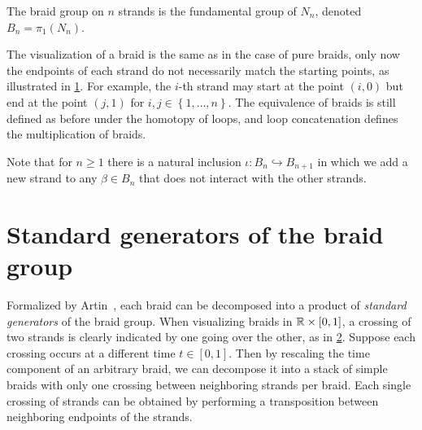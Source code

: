 \begin{definition}
    The braid group on $n$ strands is the fundamental group of $N_n$, denoted $B_n = \pi_1(N_n)$.
\end{definition}

The visualization of a braid is the same as in the case of pure braids, only now the endpoints of each strand do not necessarily match the starting points, as illustrated in \cref{fig:C_general_braid}. For example, the $i$-th strand may start at the point $(i,0)$ but end at the point $(j,1)$ for $i,j\in\left\{ 1,\dots,n \right\}$. The equivalence of braids is still defined as before under the homotopy of loops, and loop concatenation defines the multiplication of braids.

\begin{figure}[htbp]
    \centering
    
    \label{fig:C_general_braid}
\end{figure}

Note that for $n\geq 1$ there is a natural inclusion $\iota:B_n\hookrightarrow B_{n+1}$ in which we add a new strand to any $\beta\in B_n$ that does not interact with the other strands.

\section{Standard generators of the braid group}\label{sec:std_gens}
Formalized by Artin~\cite{Artin1947}, each braid can be decomposed into a product of \textit{standard generators} of the braid group. When visualizing braids in $\mathbb{R}\times[0,1]$, a crossing of two strands is clearly indicated by one going over the other, as in \cref{fig:Gen_on_Strands}. Suppose each crossing occurs at a different time $t\in[0,1]$. Then by rescaling the time component of an arbitrary braid, we can decompose it into a stack of simple braids with only one crossing between neighboring strands per braid. Each single crossing of strands can be obtained by performing a transposition between neighboring endpoints of the strands.

\begin{figure}[htbp]
    \centering
    
    \label{fig:Gen_on_Strands}
\end{figure}

